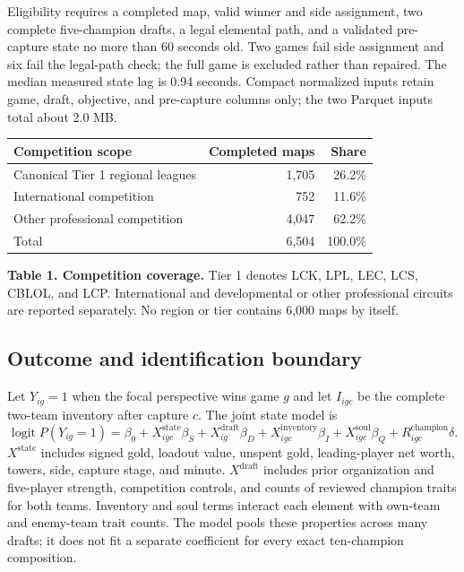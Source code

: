 \documentclass[10pt,letterpaper]{article}
\newcommand{\fineprint}[1]{{\footnotesize\color{muted}#1}}
\begin{document}
Eligibility requires a completed map, valid winner and side assignment, two complete five-champion drafts, a legal elemental path, and a validated pre-capture state no more than 60 seconds old. Two games fail side assignment and six fail the legal-path check; the full game is excluded rather than repaired. The median measured state lag is 0.94 seconds. Compact normalized inputs retain game, draft, objective, and pre-capture columns only; the two Parquet inputs total about 2.0 MB.

\begin{center}
\small
\begin{tabular}{@{}lrr@{}}
\toprule
\textbf{Competition scope} & \textbf{Completed maps} & \textbf{Share} \\
\midrule
Canonical Tier 1 regional leagues & 1,705 & 26.2\% \\
International competition & 752 & 11.6\% \\
Other professional competition & 4,047 & 62.2\% \\
\midrule
Total & 6,504 & 100.0\% \\
\bottomrule
\end{tabular}
\vspace{0.20em}

\fineprint{\textbf{Table 1. Competition coverage.} Tier 1 denotes LCK, LPL, LEC, LCS, CBLOL, and LCP. International and developmental or other professional circuits are reported separately. No region or tier contains 6,000 maps by itself.}
\end{center}

\subsection{Outcome and identification boundary}
Let $Y_{ig}=1$ when the focal perspective wins game $g$ and let $I_{igc}$ be the complete two-team inventory after capture $c$. The joint state model is
\begin{equation}
\operatorname{logit} P(Y_{ig}=1)
=\beta_0
+X^{\mathrm{state}}_{igc}\beta_S
+X^{\mathrm{draft}}_{ig}\beta_D
+X^{\mathrm{inventory}}_{igc}\beta_I
+X^{\mathrm{soul}}_{igc}\beta_Q
+R^{\mathrm{champion}}_{igc}\delta .
\end{equation}
$X^{\mathrm{state}}$ includes signed gold, loadout value, unspent gold, leading-player net worth, towers, side, capture stage, and minute. $X^{\mathrm{draft}}$ includes prior organization and five-player strength, competition controls, and counts of reviewed champion traits for both teams. Inventory and soul terms interact each element with own-team and enemy-team trait counts. The model pools these properties across many drafts; it does not fit a separate coefficient for every exact ten-champion composition.
\end{document}
